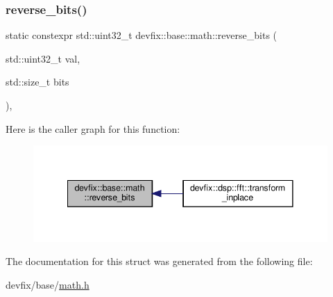\subsubsection{\texorpdfstring{reverse\+\_\+bits()}{reverse\_bits()}}
{\footnotesize\ttfamily static constexpr std\+::uint32\+\_\+t devfix\+::base\+::math\+::reverse\+\_\+bits (\begin{DoxyParamCaption}\item[{std\+::uint32\+\_\+t}]{val,  }\item[{std\+::size\+\_\+t}]{bits }\end{DoxyParamCaption})\hspace{0.3cm}{\ttfamily [inline]}, {\ttfamily [static]}}

Here is the caller graph for this function\+:\nopagebreak
\begin{figure}[H]
\begin{center}
\leavevmode
\includegraphics[width=341pt]{structdevfix_1_1base_1_1math_af3260ac1a62b3e9f6feb0f212aa8f796_icgraph}
\end{center}
\end{figure}


The documentation for this struct was generated from the following file\+:\begin{DoxyCompactItemize}
\item 
devfix/base/\hyperlink{math_8h}{math.\+h}\end{DoxyCompactItemize}
